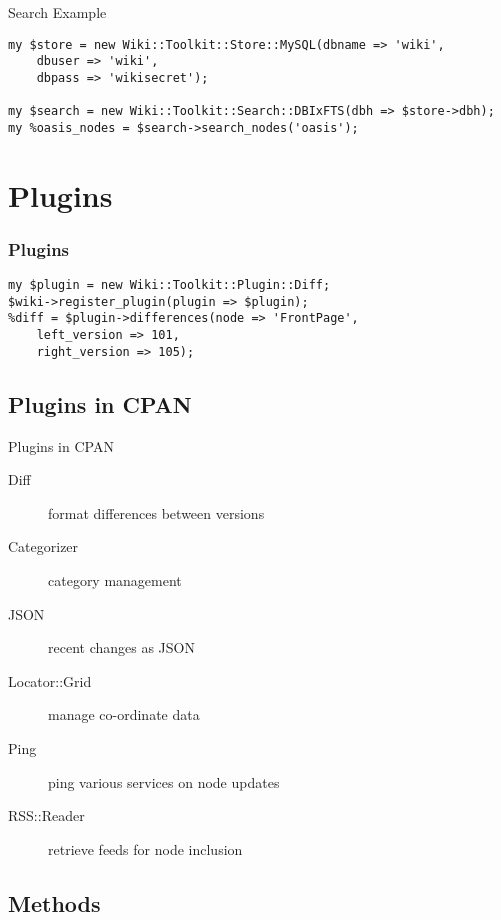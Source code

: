 \begin{frame}[fragile]{Search Example}
\begin{lstlisting}
my $store = new Wiki::Toolkit::Store::MySQL(dbname => 'wiki',
    dbuser => 'wiki',
    dbpass => 'wikisecret');

my $search = new Wiki::Toolkit::Search::DBIxFTS(dbh => $store->dbh);
my %oasis_nodes = $search->search_nodes('oasis');
\end{lstlisting}
\end{frame}

\section{Plugins}


\begin{frame}[fragile]
\frametitle{Plugins}
\begin{lstlisting}
my $plugin = new Wiki::Toolkit::Plugin::Diff;
$wiki->register_plugin(plugin => $plugin);
%diff = $plugin->differences(node => 'FrontPage',
    left_version => 101,
    right_version => 105);
\end{lstlisting}
\end{frame}

\subsection{Plugins in CPAN}

\begin{frame}{Plugins in CPAN}
 \begin{description}
  \item[Diff] format differences between versions
  \item[Categorizer] category management
  \item[JSON] recent changes as JSON
  \item[Locator::Grid] manage co-ordinate data
  \item[Ping] ping various services on node updates
  \item[RSS::Reader] retrieve feeds for node inclusion
 \end{description}
\end{frame}


\subsection{Methods}


